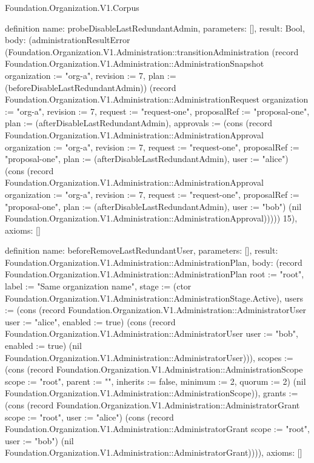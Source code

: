 \begin{lexlean}{Foundation.Organization.V1.Corpus}
\begin{semanticmodule}
definition{
  name: probeDisableLastRedundantAdmin,
  parameters: [],
  result: Bool,
  body: (administrationResultError (Foundation.Organization.V1.Administration::transitionAdministration (record Foundation.Organization.V1.Administration::AdministrationSnapshot {organization := "org-a", revision := 7, plan := (beforeDisableLastRedundantAdmin)}) (record Foundation.Organization.V1.Administration::AdministrationRequest {organization := "org-a", revision := 7, request := "request-one", proposalRef := "proposal-one", plan := (afterDisableLastRedundantAdmin), approvals := (cons (record Foundation.Organization.V1.Administration::AdministrationApproval {organization := "org-a", revision := 7, request := "request-one", proposalRef := "proposal-one", plan := (afterDisableLastRedundantAdmin), user := "alice"}) (cons (record Foundation.Organization.V1.Administration::AdministrationApproval {organization := "org-a", revision := 7, request := "request-one", proposalRef := "proposal-one", plan := (afterDisableLastRedundantAdmin), user := "bob"}) (nil Foundation.Organization.V1.Administration::AdministrationApproval)))})) 15),
  axioms: []
}

definition{
  name: beforeRemoveLastRedundantUser,
  parameters: [],
  result: Foundation.Organization.V1.Administration::AdministrationPlan,
  body: (record Foundation.Organization.V1.Administration::AdministrationPlan {root := "root", label := "Same organization name", stage := (ctor Foundation.Organization.V1.Administration::AdministrationStage.Active), users := (cons (record Foundation.Organization.V1.Administration::AdministratorUser {user := "alice", enabled := true}) (cons (record Foundation.Organization.V1.Administration::AdministratorUser {user := "bob", enabled := true}) (nil Foundation.Organization.V1.Administration::AdministratorUser))), scopes := (cons (record Foundation.Organization.V1.Administration::AdministrationScope {scope := "root", parent := "", inherits := false, minimum := 2, quorum := 2}) (nil Foundation.Organization.V1.Administration::AdministrationScope)), grants := (cons (record Foundation.Organization.V1.Administration::AdministratorGrant {scope := "root", user := "alice"}) (cons (record Foundation.Organization.V1.Administration::AdministratorGrant {scope := "root", user := "bob"}) (nil Foundation.Organization.V1.Administration::AdministratorGrant)))}),
  axioms: []
}


\end{semanticmodule}
\end{lexlean}
